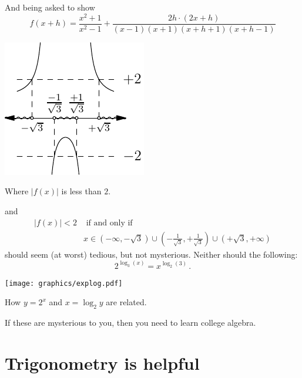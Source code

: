 And being asked to show
\begin{equation*}
    f(x+h)=\frac{x^2+1}{x^2-1}+ \frac{2h\cdot(2x+h)}{(x-1)(x+1)(x+h+1)(x+h-1)}
\end{equation*}
\begin{marginfigure}
\includegraphics[width=0.75\linewidth]{graphics/algebra2.pdf}
\caption{Where $|f(x)|$ is less than $2$.}
\label{fig:algebra2}
\end{marginfigure}
and
\begin{align*}
  |f(x)|<2 & \text{ if and only if } \\
           &  x \in (-\infty,-\sqrt{3})\cup(-\frac{1}{\sqrt{3}},+\frac{1}{\sqrt{3}})\cup(+\sqrt{3},+\infty)
\end{align*}
should seem (at worst) tedious, but not mysterious.  Neither should the following:
\begin{equation*}
    2^{\log_3(x)}=x^{\log_2(3)} \,.
\end{equation*}
\begin{marginfigure}
\texttt{[image: graphics/explog.pdf]}
\caption{How $y=2^x$ and $x=\log_2 y$ are related.}
\label{fig:explog}
\end{marginfigure}

If these are mysterious to you, then you need to learn college algebra.
\section*{Trigonometry is helpful}


